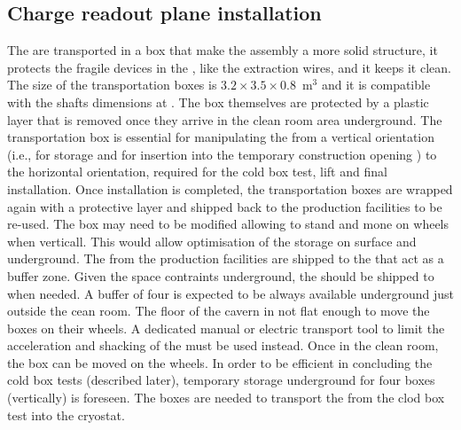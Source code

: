 \subsection{Charge readout plane installation}
The  are transported in a box that make the  assembly a more solid structure, it protects the fragile devices in the , like the extraction wires, and it keeps it clean.
The size of the transportation boxes is $3.2\times3.5\times0.8$~m$^3$ and it is compatible with the shafts dimensions at .
The box themselves are protected by a plastic layer that is removed once they arrive in the clean room area underground.
The transportation box is essential for manipulating the  from a vertical orientation (i.e., for storage and for insertion into the temporary construction opening ) to the horizontal orientation, required for the cold box test, lift and final installation.
Once installation is completed, the transportation boxes are wrapped again with a protective layer and shipped back to the production facilities to be re-used.
The  box may need to be modified allowing to stand and mone on wheels when verticall.
This would allow optimisation of the storage on surface and underground.
The  from the production facilities are shipped to the  that act as a buffer zone.
Given the space contraints underground, the  should be shipped to  when needed.
A buffer of four  is expected to be always available underground just outside the cean room.
The floor of the cavern in not flat enough to move the  boxes on their wheels.
A dedicated manual or electric transport tool to limit the acceleration and shacking of the  must be used instead.
Once in the clean room, the box can be moved on the wheels.
In order to be efficient in concluding the cold box tests (described later), temporary storage underground for four boxes (vertically) is foreseen.
The boxes are needed to transport the  from the clod box test into the cryostat.

